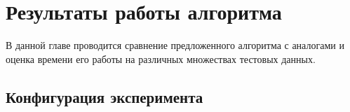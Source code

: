 \chapter{Результаты работы алгоритма}
\label{chapter3}

В данной главе проводится сравнение предложенного алгоритма с аналогами и оценка времени его работы 
на различных множествах тестовых данных.

\section{Конфигурация эксперимента}
\label{test_conf}
